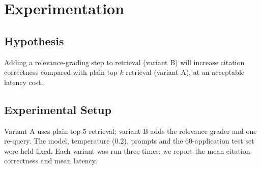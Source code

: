 \documentclass[12pt,a4paper,oneside]{report}
\newif\ifguidance
\newcommand{\guide}[1]{%
  \ifguidance
  \begin{tcolorbox}[enhanced,breakable,colback=guidebg,colframe=bmsblue,
    boxrule=0.6pt,arc=2pt,left=6pt,right=6pt,top=4pt,bottom=4pt,
    fonttitle=\bfseries\small,title={What to write here},
    before upper={\small\setstretch{1.1}}]
  #1
  \end{tcolorbox}
  \fi}
\newcommand{\dodont}[2]{%
  \ifguidance
  \begin{tcolorbox}[enhanced,breakable,sidebyside,sidebyside align=top seam,
    colback=dobg,colbacklower=dontbg,colframe=gray!60,boxrule=0.5pt,arc=2pt,
    lefthand ratio=0.5,left=5pt,right=5pt,top=4pt,bottom=4pt,
    fontupper=\small\setstretch{1.05},fontlower=\small\setstretch{1.05}]
  \textbf{\textcolor{ForestGreen}{\checkmark\ Do}}
  \begin{itemize}[leftmargin=12pt,itemsep=1pt,topsep=2pt]#1\end{itemize}
  \tcblower
  \textbf{\textcolor{BrickRed}{$\times$ Don't}}
  \begin{itemize}[leftmargin=12pt,itemsep=1pt,topsep=2pt]#2\end{itemize}
  \end{tcolorbox}
  \fi}
\newcommand{\pagebudget}[1]{%
  \ifguidance\noindent{\small\textcolor{bmsblue}{\textbf{Expected length:} #1 pages}}\par\medskip\fi}
\newenvironment{sample}
  {\par\noindent{\footnotesize\bfseries\textcolor{BrickRed}{[SAMPLE --- replace with your own content]}}\par\color{samplecol}}
  {\par\medskip}
\begin{document}
\chapter{Experimentation}
\pagebudget{2--4}
\guide{Describe one controlled experiment comparing two variants (A/B, or offline versus online), and
the design decision it informed.}

\section{Hypothesis}
\guide{State one testable hypothesis about two variants of your system.}
\dodont{\item Make the hypothesis falsifiable.
}
{\item Do not compare variants that differ in many ways at once.
}
\begin{sample}
Adding a relevance-grading step to retrieval (variant B) will increase citation correctness compared
with plain top-$k$ retrieval (variant A), at an acceptable latency cost.
\end{sample}

\section{Experimental Setup}
\guide{State what was varied, what was held fixed (model, temperature, data), the number of runs, and
the metrics.}
\dodont{\item Change only one factor between variants.
\item Repeat runs to account for randomness.
}
{\item Do not change the test set between variants.
}

\begin{sample}
Variant A uses plain top-5 retrieval; variant B adds the relevance grader and one re-query. The model,
temperature (0.2), prompts and the 60-application test set were held fixed. Each variant was run three
times; we report the mean citation correctness and mean latency.
\end{sample}
\end{document}
